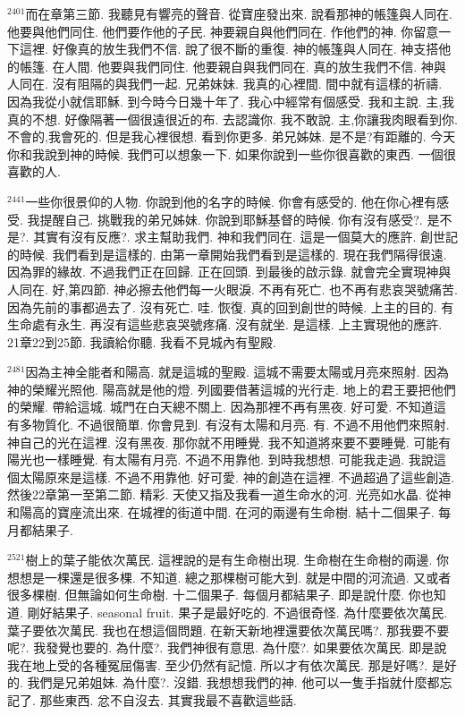 \documentclass{book}
\begin{document}
$^{2401}$而在章第三節.
我聽見有響亮的聲音.
從寶座發出來.
說看那神的帳篷與人同在.
他要與他們同住.
他們要作他的子民.
神要親自與他們同在.
作他們的神.
你留意一下這裡.
好像真的放生我們不信.
說了很不斷的重復.
神的帳篷與人同在.
神支搭他的帳篷.
在人間.
他要與我們同住.
他要親自與我們同在.
真的放生我們不信.
神與人同在.
沒有阻隔的與我們一起.
兄弟妹妹.
我真的心裡間.
間中就有這樣的祈禱.
因為我從小就信耶穌.
到今時今日幾十年了.
我心中經常有個感受.
我和主說.
主,我真的不想.
好像隔著一個很遠很近的布.
去認識你.
我不敢說.
主,你讓我肉眼看到你.
不會的,我會死的.
但是我心裡很想.
看到你更多.
弟兄姊妹.
是不是?有距離的.
今天你和我說到神的時候.
我們可以想象一下.
如果你說到一些你很喜歡的東西.
一個很喜歡的人.

$^{2441}$一些你很景仰的人物.
你說到他的名字的時候.
你會有感受的.
他在你心裡有感受.
我提醒自己.
挑戰我的弟兄姊妹.
你說到耶穌基督的時候.
你有沒有感受?.
是不是?.
其實有沒有反應?.
求主幫助我們.
神和我們同在.
這是一個莫大的應許.
創世記的時候.
我們看到是這樣的.
由第一章開始我們看到是這樣的.
現在我們隔得很遠.
因為罪的緣故.
不過我們正在回歸.
正在回頭.
到最後的啟示錄.
就會完全實現神與人同在.
好,第四節.
神必擦去他們每一火眼淚.
不再有死亡.
也不再有悲哀哭號痛苦.
因為先前的事都過去了.
沒有死亡.
哇.
恢復.
真的回到創世的時候.
上主的目的.
有生命處有永生.
再沒有這些悲哀哭號疼痛.
沒有就坐.
是這樣.
上主實現他的應許.
21章22到25節.
我讀給你聽.
我看不見城內有聖殿.

$^{2481}$因為主神全能者和陽高.
就是這城的聖殿.
這城不需要太陽或月亮來照射.
因為神的榮耀光照他.
陽高就是他的燈.
列國要借著這城的光行走.
地上的君王要把他們的榮耀.
帶給這城.
城門在白天總不關上.
因為那裡不再有黑夜.
好可愛.
不知道這有多物質化.
不過很簡單.
你會見到.
有沒有太陽和月亮.
有.
不過不用他們來照射.
神自己的光在這裡.
沒有黑夜.
那你就不用睡覺.
我不知道將來要不要睡覺.
可能有陽光也一樣睡覺.
有太陽有月亮.
不過不用靠他.
到時我想想.
可能我走過.
我說這個太陽原來是這樣.
不過不用靠他.
好可愛.
神的創造在這裡.
不過超過了這些創造.
然後22章第一至第二節.
精彩.
天使又指及我看一道生命水的河.
光亮如水晶.
從神和陽高的寶座流出來.
在城裡的街道中間.
在河的兩邊有生命樹.
結十二個果子.
每月都結果子.

$^{2521}$樹上的葉子能依次萬民.
這裡說的是有生命樹出現.
生命樹在生命樹的兩邊.
你想想是一棵還是很多棵.
不知道.
總之那棵樹可能大到.
就是中間的河流過.
又或者很多棵樹.
但無論如何生命樹.
十二個果子.
每個月都結果子.
即是說什麼.
你也知道.
剛好結果子.
seasonal fruit.
果子是最好吃的.
不過很奇怪.
為什麼要依次萬民.
葉子要依次萬民.
我也在想這個問題.
在新天新地裡還要依次萬民嗎?.
那我要不要呢?.
我發覺也要的.
為什麼?.
我們神很有意思.
為什麼?.
如果要依次萬民.
即是說我在地上受的各種冤屈傷害.
至少仍然有記憶.
所以才有依次萬民.
那是好嗎?.
是好的.
我們是兄弟姐妹.
為什麼?.
沒錯.
我想想我們的神.
他可以一隻手指就什麼都忘記了.
那些東西.
忿不自沒去.
其實我最不喜歡這些話.
\end{document}
